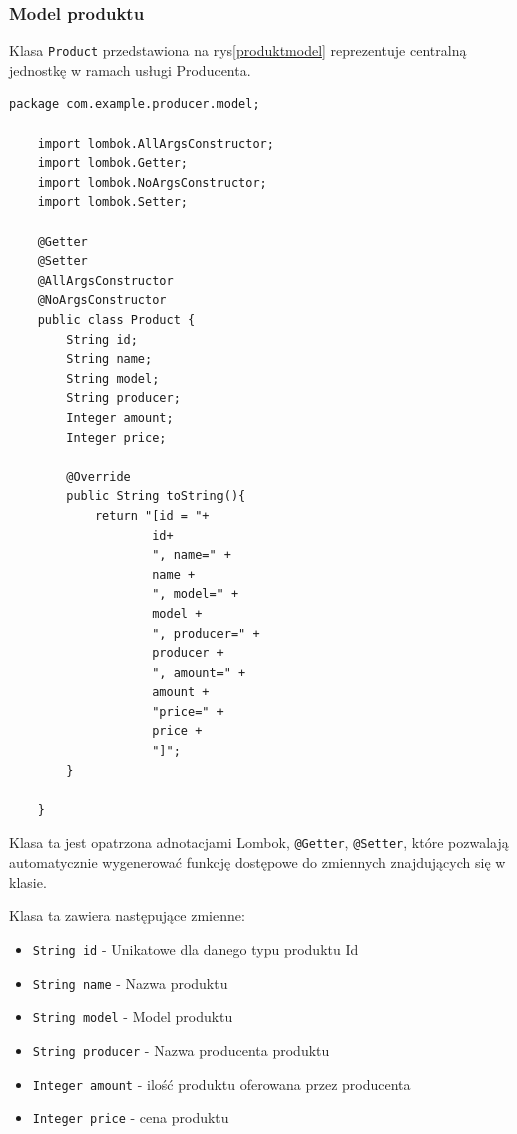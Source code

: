 \subsubsection{Model produktu}

Klasa \verb|Product| przedstawiona na rys\ref{produktmodel} reprezentuje centralną jednostkę w ramach usługi Producenta.

\begin{lstlisting}[caption=Klasa reprezentująca produkt, label=produktmodel]
    package com.example.producer.model;
    
    import lombok.AllArgsConstructor;
    import lombok.Getter;
    import lombok.NoArgsConstructor;
    import lombok.Setter;
    
    @Getter
    @Setter
    @AllArgsConstructor
    @NoArgsConstructor
    public class Product {
        String id;
        String name;
        String model;
        String producer;
        Integer amount;
        Integer price;
    
        @Override
        public String toString(){
            return "[id = "+
                    id+
                    ", name=" +
                    name +
                    ", model=" +
                    model +
                    ", producer=" +
                    producer +
                    ", amount=" +
                    amount +
                    "price=" +
                    price +
                    "]";
        }
    
    }
\end{lstlisting}

Klasa ta jest opatrzona adnotacjami Lombok, \verb|@Getter|, \verb|@Setter|, które pozwalają automatycznie wygenerować funkcję dostępowe do zmiennych znajdujących się w klasie.

Klasa ta zawiera następujące zmienne:
\begin{itemize}
    \item \verb|String id| - Unikatowe dla danego typu produktu Id
    \item \verb|String name| - Nazwa produktu
    \item \verb|String model| - Model produktu
    \item \verb|String producer| - Nazwa producenta produktu
    \item \verb|Integer amount| - ilość produktu oferowana przez producenta
    \item \verb|Integer price| - cena produktu
\end{itemize}

